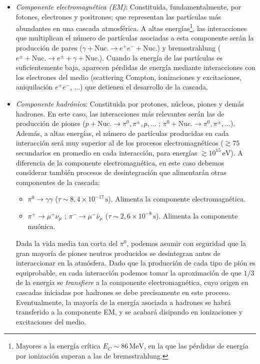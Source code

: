 \documentclass[11 pt, a4paper]{article} %
\numberwithin{equation}{section}
\numberwithin{figure}{section}
\numberwithin{table}{section}
\begin{document}
\begin{itemize}
	\item\textit{Componente electromagnética (EM)}: Constituida, fundamentalmente, por fotones, electrones y positrones; que representan las partículas más abundantes en una cascada atmosférica. A altas energías\footnote{ Mayores a la energía crítica $E_C\sim86\,\mathrm{MeV}$, en la que las pérdidas de energía por ionización superan a las de bremsstrahlung.}, las interacciones que multiplican el número de partículas asociadas a esta componente serán la producción de pares ($\gamma+\text{Nuc.}\rightarrow e^+e^-+\text{Nuc.}$) y bremsstrahlung ($e^\pm+\text{Nuc.}\rightarrow e^\pm+\gamma+\text{Nuc.}$). Cuando la energía de las partículas es suficientemente baja, aparecen pérdidas de energía mediante interacciones con los electrones del medio (scattering Compton, ionizaciones y excitaciones, aniquilación $e^+e^-$, ...) que detienen el desarrollo de la cascada.
	\item\textit{Componente hadrónica}: Constituida por protones, núcleos, piones y demás hadrones. En este caso, las interacciones más relevantes serán las de producción de piones ($p+\text{Nuc.}\rightarrow\pi^0,\pi^\pm,p,...$ ; $\pi^0+\text{Nuc.}\rightarrow \pi^0,\pi^\pm,...$). Además, a altas energías, el número de partículas producidas en cada interacción será muy superior al de los procesos electromagnéticos ($\gtrsim75$ secundarios en promedio en cada interacción, para energías $\gtrsim10^{15}\,\mathrm{eV}$). A diferencia de la componente electromagnética, en este caso debemos considerar también procesos de desintegración que alimentarán otras componentes de la cascada:
	\begin{itemize}
		\item $\pi^0\rightarrow\gamma\gamma$ ($\tau\sim8,4\times10^{-17}\,\mathrm{s}$). Alimenta la componente electromagnética.
		\item  $\pi^+\rightarrow\mu^+\nu_\mu$ ; $\pi^-\rightarrow\mu^-\bar\nu_\mu$ ($\tau\sim2,6\times10^{-8}\,\mathrm{s}$). Alimenta la componente muónica.
	\end{itemize}
Dada la vida media tan corta del $\pi^0$, podemos asumir con seguridad que la gran mayoría de piones neutros producidos se desintegran antes de interaccionar en la atmósfera. Dado que la producción de cada tipo de pión es equiprobable, en cada interacción podemos tomar la aproximación de que $1/3$ de la energía se \textit{transfiere} a la componente electromagnética, cuyo origen en cascadas iniciadas por hadrones se debe precisamente en este proceso. Eventualmente, la mayoría de la energía asociada a hadrones se habrá transferido a la componente EM, y se acabará disipando en ionizaciones y excitaciones del medio.


\end{itemize}
\end{document}
